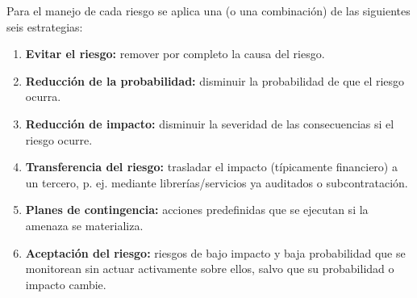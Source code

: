 \begin{table}[H]
\centering
\caption{Matriz de riesgo 5$\times$5 (Probabilidad $\times$ Impacto)}
\label{tab:matriz-riesgo}
\end{table}

Para el manejo de cada riesgo se aplica una (o una combinación) de las siguientes seis estrategias:

\begin{enumerate}[leftmargin=*]
    \item \textbf{Evitar el riesgo:} remover por completo la causa del riesgo.
    \item \textbf{Reducción de la probabilidad:} disminuir la probabilidad de que el riesgo ocurra.
    \item \textbf{Reducción de impacto:} disminuir la severidad de las consecuencias si el riesgo ocurre.
    \item \textbf{Transferencia del riesgo:} trasladar el impacto (típicamente financiero) a un tercero, p. ej. mediante librerías/servicios ya auditados o subcontratación.
    \item \textbf{Planes de contingencia:} acciones predefinidas que se ejecutan si la amenaza se materializa.
    \item \textbf{Aceptación del riesgo:} riesgos de bajo impacto y baja probabilidad que se monitorean sin actuar activamente sobre ellos, salvo que su probabilidad o impacto cambie.
\end{enumerate}

